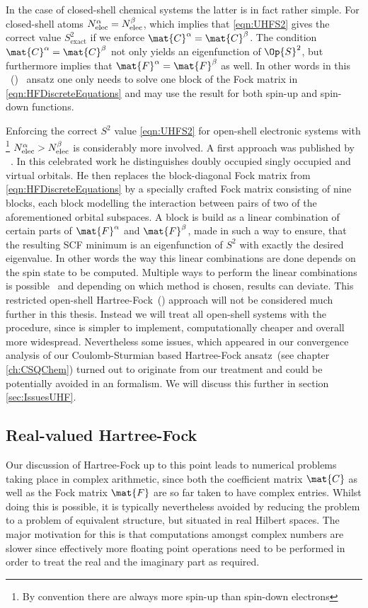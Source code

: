 In the case of closed-shell chemical systems the latter is in fact rather simple.
For closed-shell atoms $N_\text{elec}^\alpha = N_\text{elec}^\beta$,
which implies that \eqref{eqn:UHFS2}
gives the correct value $S^2_\text{exact}$ if we enforce $\mat{C}^\alpha = \mat{C}^\beta$.
The condition $\mat{C}^\alpha = \mat{C}^\beta$ not only yields
an eigenfunction of  $\Op{S}^2$,
but furthermore implies that $\mat{F}^\alpha = \mat{F}^\beta$ as well.
In other words in this
~(\RHF)~\cite{Roothaan1951}
ansatz one only needs to solve one block of the Fock matrix
in \eqref{eqn:HFDiscreteEquations} and may use the result for both
spin-up and spin-down functions.

Enforcing the correct $S^2$ value \eqref{eqn:UHFS2}
for open-shell electronic systems
with%
\footnote{By convention there are always more spin-up than spin-down electrons}
$N_\text{elec}^\alpha > N_\text{elec}^\beta$
is considerably more involved.
A first approach was published by \citeauthor{Roothaan1960}
~\cite{Roothaan1960,Alder1963}.
In this celebrated work he
distinguishes doubly occupied singly occupied and virtual orbitals.
He then replaces the
block-diagonal Fock matrix from \eqref{eqn:HFDiscreteEquations}
by a specially crafted Fock matrix
consisting of nine blocks,
each block modelling the interaction between pairs of two
of the aforementioned orbital subspaces.
A block is build as a linear combination
of certain parts of $\mat{F}^\alpha$ and $\mat{F}^\beta$,
made in such a way to ensure,
that the resulting SCF minimum is an eigenfunction of $S^2$
with exactly the desired eigenvalue.
In other words the way this linear combinations are done
depends on the spin state to be computed.
Multiple ways to perform the linear combinations is possible~\cite{Glaesemann2010}
and depending on which method is chosen, results can deviate.
This restricted open-shell Hartree-Fock~(\ROHF) approach
will not be considered much further in this thesis.
Instead we will treat all open-shell systems with the \UHF procedure,
since \UHF is simpler to implement, computationally cheaper and overall more widespread.
Nevertheless some issues,
which appeared in our convergence analysis of our
Coulomb-Sturmian based Hartree-Fock ansatz~(see chapter \vref{ch:CSQChem})
turned out to originate from our \UHF treatment
and could be potentially avoided in an \ROHF formalism.
We will discuss this further in section \vref{sec:IssuesUHF}.

\subsection{Real-valued Hartree-Fock}
Our discussion of Hartree-Fock up to this point
leads to numerical problems taking place in complex arithmetic,
since both the coefficient matrix $\mat{C}$
as well as the Fock matrix $\mat{F}$
are so far taken to have complex entries.
Whilst doing this is possible,
it is typically nevertheless
avoided by reducing
the \HF problem to a problem of equivalent structure,
but situated in real Hilbert spaces.
The major motivation for this is that computations
amongst complex numbers are slower since effectively
more floating point operations need to be performed
in order to treat the real and the imaginary part as required.

